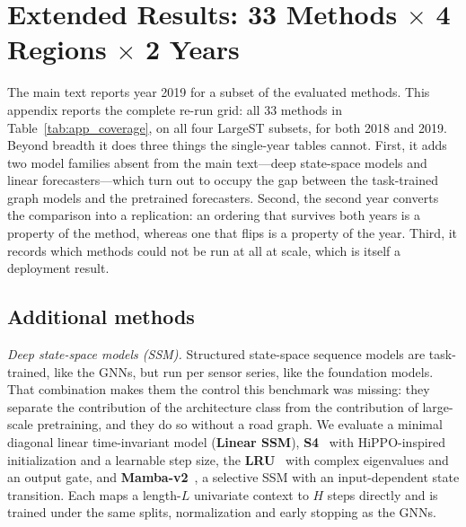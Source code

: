 
\section{Extended Results: 33 Methods $\times$ 4 Regions $\times$ 2 Years}
\label{app:extended}

The main text reports year 2019 for a subset of the evaluated methods. This
appendix reports the complete re-run grid: all 33 methods in
Table~\ref{tab:app_coverage}, on all four LargeST subsets, for both 2018 and
2019. Beyond breadth it does three things the single-year tables cannot.
First, it adds two model families absent from the main text---deep state-space
models and linear forecasters---which turn out to occupy the gap between the
task-trained graph models and the pretrained forecasters. Second, the second
year converts the comparison into a replication: an ordering that survives both
years is a property of the method, whereas one that flips is a property of the
year. Third, it records which methods could not be run at all at scale, which
is itself a deployment result.

\subsection{Additional methods}
\label{app:extended:methods}

\textit{Deep state-space models (SSM).} Structured state-space sequence models
are task-trained, like the GNNs, but run per sensor series, like the foundation
models. That combination makes them the control this benchmark was missing: they
separate the contribution of the architecture class from the contribution of
large-scale pretraining, and they do so without a road graph. We evaluate a
minimal diagonal linear time-invariant model (\textbf{Linear SSM}),
\textbf{S4}~\citep{gu2022s4, gu2022s4d} with HiPPO-inspired initialization and a
learnable step size, the \textbf{LRU}~\citep{orvieto2023lru} with complex
eigenvalues and an output gate, and \textbf{Mamba-v2}~\citep{dao2024mamba2}, a
selective SSM with an input-dependent state transition. Each maps a length-$L$ univariate context to $H$ steps directly and
is trained under the same splits, normalization and early stopping as the GNNs.

